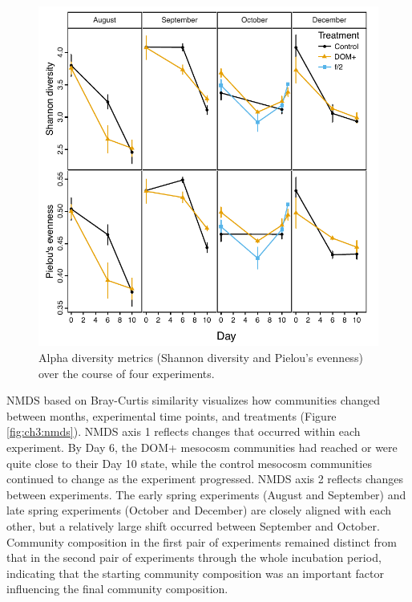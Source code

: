 \begin{figure}[ht!] 
\centering 
\includegraphics[width=\textwidth]{Chapter_4_DOM/Figures/Supplemental_Figure_4_alpha_diversity}
\caption[Alpha diversity metrics (Shannon diversity and Pielou’s evenness) over the course of four experiments.]{Alpha diversity metrics (Shannon diversity and Pielou’s evenness) over the course of four experiments.} 
\label{fig:ch3:alpha_diversity} 
\end{figure}

NMDS based on Bray-Curtis similarity visualizes how communities changed between months, experimental time points, and treatments (Figure \ref{fig:ch3:nmds}). NMDS axis 1 reflects changes that occurred within each experiment. By Day 6, the DOM+ mesocosm communities had reached or were quite close to their Day 10 state, while the control mesocosm communities continued to change as the experiment progressed. NMDS axis 2 reflects changes between experiments. The early spring experiments (August and September) and late spring experiments (October and December) are closely aligned with each other, but a relatively large shift occurred between September and October. Community composition in the first pair of experiments remained distinct from that in the second pair of experiments through the whole incubation period, indicating that the starting community composition was an important factor influencing the final community composition.


